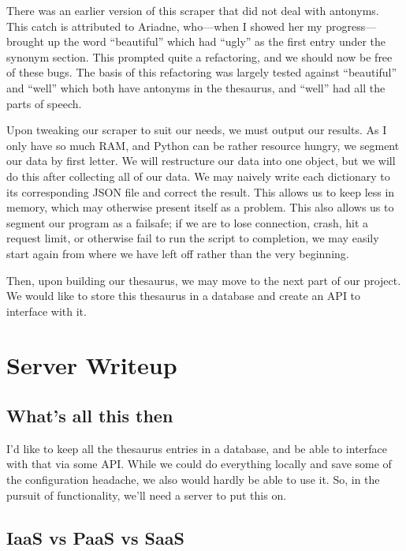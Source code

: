 \documentclass[11pt, twoside, reqno]{book}
\begin{document}
There was an earlier version of this scraper that did not deal with antonyms. This catch is attributed to Ariadne, who—when I showed her my progress—brought up the word ``beautiful'' which had ``ugly'' as the first entry under the synonym section. This prompted quite a refactoring, and we should now be free of these bugs. The basis of this refactoring was largely tested against ``beautiful'' and ``well'' which both have antonyms in the thesaurus, and ``well'' had all the parts of speech.

Upon tweaking our scraper to suit our needs, we must output our results. As I only have so much RAM, and Python can be rather resource hungry, we segment our data by first letter. We will restructure our data into one object, but we will do this after collecting all of our data. We may naively write each dictionary to its corresponding JSON file and correct the result. This allows us to keep less in memory, which may otherwise present itself as a problem. This also allows us to segment our program as a failsafe; if we are to lose connection, crash, hit a request limit, or otherwise fail to run the script to completion, we may easily start again from where we have left off rather than the very beginning.

Then, upon building our thesaurus, we may move to the next part of our project. We would like to store this thesaurus in a database and create an API to interface with it.

\chapter{Server Writeup}

\section{What's all this then}


I'd like to keep all the thesaurus entries in a database, and be able to interface with that via some API. While we could do everything locally and save some of the configuration headache, we also would hardly be able to use it. So, in the pursuit of functionality, we'll need a server to put this on.

\section{IaaS vs PaaS vs SaaS}
\end{document}
